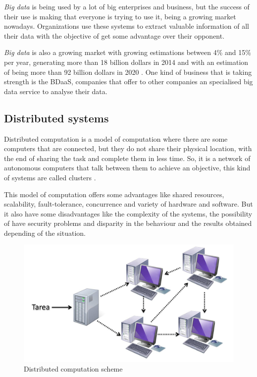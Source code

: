 \textit{Big data} is being used by a lot of big enterprises and business, but the success of their use is making that everyone is trying to use it, being a growing market nowadays. Organizations use these systems to extract valuable information of all their data with the objective of get some advantage over their opponent.

\textit{Big data} is also a growing market with growing estimations between 4\% and 15\% per year, generating more than 18 billion dollars in 2014 and with an estimation of being more than 92 billion dollars in 2020 \cite{forecast}. One kind of business that is taking strength is the \gls{BDaaS}, companies that offer to other companies an specialised big data service to analyse their data. 

\subsection{Distributed systems}
Distributed computation is a model of computation where there are some computers that are connected, but they do not share their physical location, with the end of sharing the task and complete them in less time. So, it is a network of autonomous computers that talk between them to achieve an objective, this kind of systems are called clusters \cite{computacionDistribuidad}.

This model of computation offers some advantages like shared resources, scalability, fault-tolerance, concurrence and variety of hardware and software. But it also have some disadvantages like the complexity of the systems, the possibility of have security problems and disparity in the behaviour and the results obtained depending of the situation.

\begin{figure}[htp!]
	\centering
	\caption{Distributed computation scheme \cite{fotodistribuida}}
	\label{distribuidaEng}
	\vspace{5pt}
	\includegraphics[scale=0.3]{graphics/computaciondistribuida}
\end{figure}

